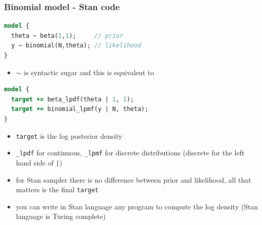\documentclass[10pt]{beamer}
\begin{document}
\begin{frame}[fragile]

\frametitle{Binomial model - Stan code}

  {\small
\begin{lstlisting}[language=Stan]
model {
  theta ~ beta(1,1);     // prior
  y ~ binomial(N,theta); // likelihood
}
\end{lstlisting}}

    \vspace{-0.5\baselineskip}
    \begin{itemize}
    \item $\sim$ is syntactic sugar and this is equivalent to
    \end{itemize}

  {\small
\begin{lstlisting}[language=Stan]
model {
  target += beta_lpdf(theta | 1, 1);
  target += binomial_lpmf(y | N, theta);
}
\end{lstlisting}}

    \vspace{-0.5\baselineskip}
    \begin{itemize}
    \item<2-> {\tt target} is the log posterior density
    \item<3-> {\tt \_lpdf} for continuous, {\tt \_lpmf} for discrete distributions (discrete for the left hand side of {\tt |})
    \item<4-> for Stan sampler there is no difference between prior and likelihood, all that matters is the final {\tt target}
    \item<5-> you can write in Stan language any program to compute the
      log density (Stan language is Turing complete)
    \end{itemize}

\end{frame}




\end{document}
